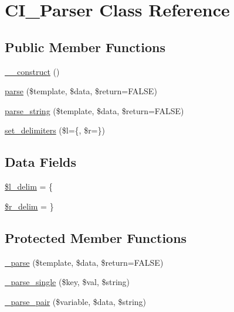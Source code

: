 \hypertarget{class_c_i___parser}{}\section{C\+I\+\_\+\+Parser Class Reference}
\label{class_c_i___parser}
\subsection*{Public Member Functions}
\begin{DoxyCompactItemize}
\item 
\mbox{\hyperlink{class_c_i___parser_a095c5d389db211932136b53f25f39685}{\+\_\+\+\_\+construct}} ()
\item 
\mbox{\hyperlink{class_c_i___parser_aed3a838a4afdff95c4bf2b1fb5062cbd}{parse}} (\$template, \$data, \$return=F\+A\+L\+SE)
\item 
\mbox{\hyperlink{class_c_i___parser_a5cdfa809d6f2988d2741cb26b5a51d36}{parse\+\_\+string}} (\$template, \$data, \$return=F\+A\+L\+SE)
\item 
\mbox{\hyperlink{class_c_i___parser_afd4d621c3786d2cdb554f3c2f7cf2749}{set\+\_\+delimiters}} (\$l=\textquotesingle{}\{\textquotesingle{}, \$r=\textquotesingle{}\}\textquotesingle{})
\end{DoxyCompactItemize}
\subsection*{Data Fields}
\begin{DoxyCompactItemize}
\item 
\mbox{\hyperlink{class_c_i___parser_ab957da01a735e612795fba1c5802b1fb}{\$l\+\_\+delim}} = \textquotesingle{}\{\textquotesingle{}
\item 
\mbox{\hyperlink{class_c_i___parser_a4d80dc6a622989846dbd0e39fde0f3bb}{\$r\+\_\+delim}} = \textquotesingle{}\}\textquotesingle{}
\end{DoxyCompactItemize}
\subsection*{Protected Member Functions}
\begin{DoxyCompactItemize}
\item 
\mbox{\hyperlink{class_c_i___parser_a6bd5ad826db82a61de1f3a13031faaf9}{\+\_\+parse}} (\$template, \$data, \$return=F\+A\+L\+SE)
\item 
\mbox{\hyperlink{class_c_i___parser_a01c9bb8a5e8802a1b21acf829cc181e7}{\+\_\+parse\+\_\+single}} (\$key, \$val, \$string)
\item 
\mbox{\hyperlink{class_c_i___parser_a3f01fef88e49c40d679e35dedf89a128}{\+\_\+parse\+\_\+pair}} (\$variable, \$data, \$string)
\end{DoxyCompactItemize}

